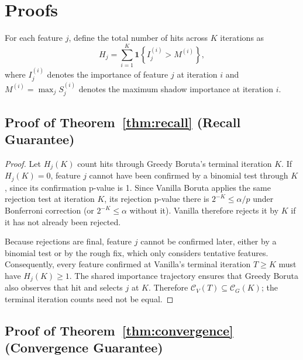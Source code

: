 \documentclass[runningheads]{llncs}
\begin{document}



\appendix
\renewcommand{\theHsection}{\Alph{section}}

\section{Proofs}
\label{app:proofs}

For each feature $j$, define the total number of hits across $K$ iterations as
\[
H_j = \sum_{i=1}^{K} \mathbf{1}\!\left\{ I_j^{(i)} > M^{(i)} \right\},
\]
where $I_j^{(i)}$ denotes the importance of feature $j$ at iteration $i$ and $M^{(i)} = \max_j S_j^{(i)}$ denotes the maximum shadow importance at iteration $i$.

\subsection{Proof of Theorem~\ref{thm:recall} (Recall Guarantee)}

\begin{proof}
Let $H_j(K)$ count hits through Greedy Boruta's terminal iteration $K$. If $H_j(K)=0$, feature $j$ cannot have been confirmed by a binomial test through $K$, since its confirmation p-value is 1. Since Vanilla Boruta applies the same rejection test at iteration $K$, its rejection p-value there is $2^{-K}\leq\alpha/p$ under Bonferroni correction (or $2^{-K}\leq\alpha$ without it). Vanilla therefore rejects it by $K$ if it has not already been rejected.

Because rejections are final, feature $j$ cannot be confirmed later, either by a binomial test or by the rough fix, which only considers tentative features. Consequently, every feature confirmed at Vanilla's terminal iteration $T\geq K$ must have $H_j(K)\geq1$. The shared importance trajectory ensures that Greedy Boruta also observes that hit and selects $j$ at $K$. Therefore $\mathcal{C}_V(T)\subseteq\mathcal{C}_G(K)$; the terminal iteration counts need not be equal.
\end{proof}

\subsection{Proof of Theorem~\ref{thm:convergence} (Convergence Guarantee)}
\end{document}
